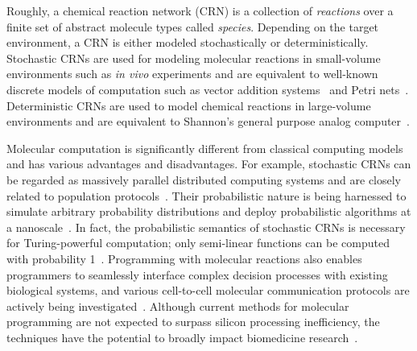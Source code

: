 Roughly, a chemical reaction network (CRN) is a collection of \emph{reactions} over a finite set of abstract molecule types called \emph{species}.
Depending on the target environment, a CRN is either modeled stochastically or deterministically.
Stochastic CRNs are used for modeling molecular reactions in small-volume environments such as \emph{in vivo} experiments and are equivalent to well-known discrete models of computation such as vector addition systems~\cite{oGins66,jKaMiWi67,jKarMil69,jNash73,jLero10,cLero12} and Petri nets~\cite{oPetr62,jMura89,oDavAll10,oReis13}.
Deterministic CRNs are used to model chemical reactions in large-volume environments and are equivalent to Shannon's general purpose analog computer~\cite{jShan41,jGraCos03,jGrac04,cBoGrPo16,cFLBP17,rtcrn2}.

Molecular computation is significantly different from classical computing models and has various advantages and disadvantages.
For example, stochastic CRNs can be regarded as massively parallel distributed computing systems and are closely related to population protocols~\cite{jAADFP06,jAAER07,jAnAsEi08,jAnAsEi08a,Doty2018}.
Their probabilistic nature is being harnessed to simulate arbitrary probability distributions and deploy probabilistic algorithms at a nanoscale~\cite{jCaKwLa18,jCOAW19,cWinfe19}.
In fact, the probabilistic semantics of stochastic CRNs is necessary for Turing-powerful computation; only semi-linear functions can be computed with probability 1~\cite{cChDoSo12,cCuDoSo14,Doty2015,doty19}.
Programming with molecular reactions also enables programmers to seamlessly interface complex decision processes with existing biological systems, and various cell-to-cell molecular communication protocols are actively being investigated~\cite{jPieAky10,jFYECG16,jChou19}.
Although current methods for molecular programming are not expected to surpass silicon processing inefficiency, the techniques have the potential to broadly impact biomedicine research~\cite{jorge2018overview}.


